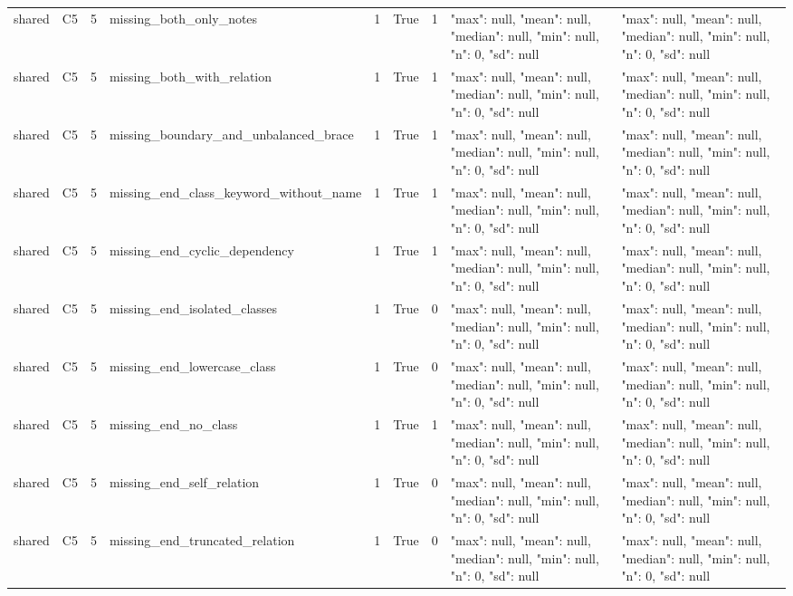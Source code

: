 \begin{tabular}{lllllllll}
shared & C5 & 5 & missing\_both\_only\_notes & 1 & True & 1 & {"max": null, "mean": null, "median": null, "min": null, "n": 0, "sd": null} & {"max": null, "mean": null, "median": null, "min": null, "n": 0, "sd": null} \\
shared & C5 & 5 & missing\_both\_with\_relation & 1 & True & 1 & {"max": null, "mean": null, "median": null, "min": null, "n": 0, "sd": null} & {"max": null, "mean": null, "median": null, "min": null, "n": 0, "sd": null} \\
shared & C5 & 5 & missing\_boundary\_and\_unbalanced\_brace & 1 & True & 1 & {"max": null, "mean": null, "median": null, "min": null, "n": 0, "sd": null} & {"max": null, "mean": null, "median": null, "min": null, "n": 0, "sd": null} \\
shared & C5 & 5 & missing\_end\_class\_keyword\_without\_name & 1 & True & 1 & {"max": null, "mean": null, "median": null, "min": null, "n": 0, "sd": null} & {"max": null, "mean": null, "median": null, "min": null, "n": 0, "sd": null} \\
shared & C5 & 5 & missing\_end\_cyclic\_dependency & 1 & True & 1 & {"max": null, "mean": null, "median": null, "min": null, "n": 0, "sd": null} & {"max": null, "mean": null, "median": null, "min": null, "n": 0, "sd": null} \\
shared & C5 & 5 & missing\_end\_isolated\_classes & 1 & True & 0 & {"max": null, "mean": null, "median": null, "min": null, "n": 0, "sd": null} & {"max": null, "mean": null, "median": null, "min": null, "n": 0, "sd": null} \\
shared & C5 & 5 & missing\_end\_lowercase\_class & 1 & True & 0 & {"max": null, "mean": null, "median": null, "min": null, "n": 0, "sd": null} & {"max": null, "mean": null, "median": null, "min": null, "n": 0, "sd": null} \\
shared & C5 & 5 & missing\_end\_no\_class & 1 & True & 1 & {"max": null, "mean": null, "median": null, "min": null, "n": 0, "sd": null} & {"max": null, "mean": null, "median": null, "min": null, "n": 0, "sd": null} \\
shared & C5 & 5 & missing\_end\_self\_relation & 1 & True & 0 & {"max": null, "mean": null, "median": null, "min": null, "n": 0, "sd": null} & {"max": null, "mean": null, "median": null, "min": null, "n": 0, "sd": null} \\
shared & C5 & 5 & missing\_end\_truncated\_relation & 1 & True & 0 & {"max": null, "mean": null, "median": null, "min": null, "n": 0, "sd": null} & {"max": null, "mean": null, "median": null, "min": null, "n": 0, "sd": null} \\

\end{tabular}
